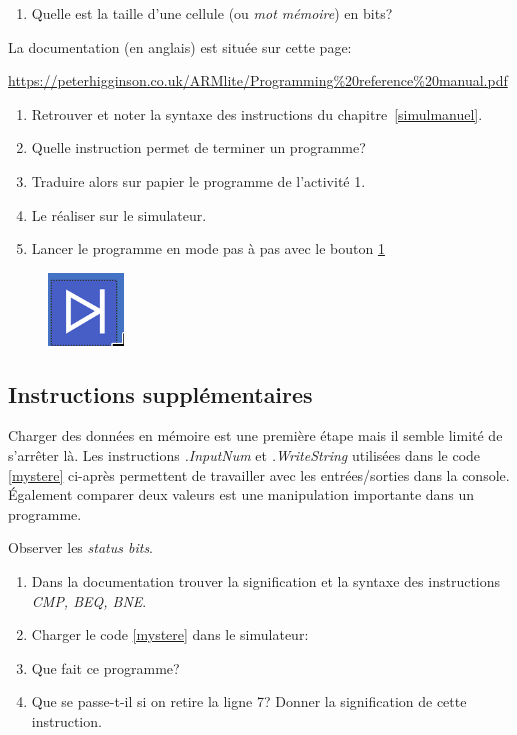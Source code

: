 \documentclass[a4paper,11pt]{article}
\begin{document}
\begin{Form}
\begin{activite}
\begin{enumerate}
\item Quelle est la taille d'une cellule (ou \emph{mot mémoire}) en bits?
\end{enumerate}
\end{activite}
La documentation (en anglais) est située sur cette page:
\begin{center}
\url{https://peterhigginson.co.uk/ARMlite/Programming%20reference%20manual.pdf}
\end{center}
\begin{activite}
\begin{enumerate}
\item Retrouver et noter la syntaxe des instructions du chapitre~\ref{simulmanuel}.
\item Quelle instruction permet de terminer un programme?
\item Traduire alors sur papier le programme de l'activité 1.
\item Le réaliser sur le simulateur.
\item Lancer le programme en mode pas à pas avec le bouton \ref{pasapas}
\end{enumerate}
\end{activite}
\begin{figure}[!h]
\centering
\includegraphics[width=2cm]{ressources/pasapas.png}
\label{pasapas}
\end{figure}
\subsection{Instructions supplémentaires}
Charger des données en mémoire est une première étape mais il semble limité de s'arrêter là. Les instructions \emph{.InputNum} et \emph{.WriteString} utilisées dans le code \ref{mystere} ci-après permettent de travailler avec les entrées/sorties dans la console.\\Également comparer deux valeurs est une manipulation importante dans un programme.
\begin{commentprof}
Observer les \emph{status bits}.
\end{commentprof}
\begin{activite}
\begin{enumerate}
\item Dans la documentation trouver la signification et la syntaxe des instructions \emph{CMP, BEQ, BNE}.
\item Charger le code \ref{mystere} dans le simulateur:

\item Que fait ce programme?
\item Que se passe-t-il si on retire la ligne 7? Donner la signification de cette instruction.
\end{enumerate}
\end{activite}

\end{Form}
\end{document}
